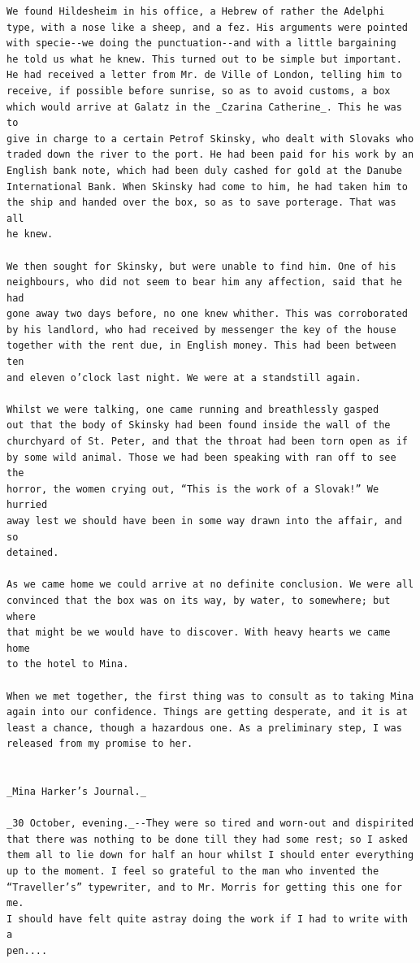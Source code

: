 \documentclass{article}
\begin{document}
\begin{verbatim}
We found Hildesheim in his office, a Hebrew of rather the Adelphi
type, with a nose like a sheep, and a fez. His arguments were pointed
with specie--we doing the punctuation--and with a little bargaining
he told us what he knew. This turned out to be simple but important.
He had received a letter from Mr. de Ville of London, telling him to
receive, if possible before sunrise, so as to avoid customs, a box
which would arrive at Galatz in the _Czarina Catherine_. This he was to
give in charge to a certain Petrof Skinsky, who dealt with Slovaks who
traded down the river to the port. He had been paid for his work by an
English bank note, which had been duly cashed for gold at the Danube
International Bank. When Skinsky had come to him, he had taken him to
the ship and handed over the box, so as to save porterage. That was all
he knew.

We then sought for Skinsky, but were unable to find him. One of his
neighbours, who did not seem to bear him any affection, said that he had
gone away two days before, no one knew whither. This was corroborated
by his landlord, who had received by messenger the key of the house
together with the rent due, in English money. This had been between ten
and eleven o’clock last night. We were at a standstill again.

Whilst we were talking, one came running and breathlessly gasped
out that the body of Skinsky had been found inside the wall of the
churchyard of St. Peter, and that the throat had been torn open as if
by some wild animal. Those we had been speaking with ran off to see the
horror, the women crying out, “This is the work of a Slovak!” We hurried
away lest we should have been in some way drawn into the affair, and so
detained.

As we came home we could arrive at no definite conclusion. We were all
convinced that the box was on its way, by water, to somewhere; but where
that might be we would have to discover. With heavy hearts we came home
to the hotel to Mina.

When we met together, the first thing was to consult as to taking Mina
again into our confidence. Things are getting desperate, and it is at
least a chance, though a hazardous one. As a preliminary step, I was
released from my promise to her.


_Mina Harker’s Journal._

_30 October, evening._--They were so tired and worn-out and dispirited
that there was nothing to be done till they had some rest; so I asked
them all to lie down for half an hour whilst I should enter everything
up to the moment. I feel so grateful to the man who invented the
“Traveller’s” typewriter, and to Mr. Morris for getting this one for me.
I should have felt quite astray doing the work if I had to write with a
pen....


\end{verbatim}
\end{document}
